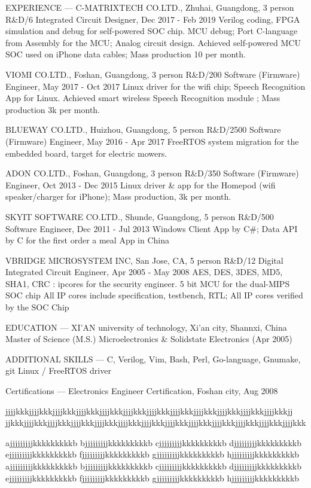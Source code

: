 EXPERIENCE
---
C-MATRIXTECH CO.LTD., Zhuhai, Guangdong, 3 person R\&D/6
Integrated Circuit Designer, Dec 2017 - Feb 2019
 Verilog coding, FPGA simulation and debug for self-powered SOC chip. 
 MCU debug; Port C-language from Assembly for the MCU; Analog circuit design.
 Achieved self-powered MCU SOC used on iPhone data cables; Mass production 10 per month.

VIOMI CO.LTD., Foshan, Guangdong, 3 person R\&D/200
Software (Firmware) Engineer, May 2017 - Oct 2017
 Linux driver for the wifi chip; Speech Recognition App for Linux.
 Achieved smart wireless Speech Recognition module ; Mass production 3k per month.

BLUEWAY CO.LTD., Huizhou, Guangdong, 5 person R\&D/2500
Software (Firmware) Engineer, May 2016 - Apr 2017
 FreeRTOS system migration for the embedded board, target for electric mowers.

ADON CO.LTD., Foshan, Guangdong, 3 person R\&D/350
Software (Firmware) Engineer, Oct 2013 - Dec 2015
 Linux driver \& app for the Homepod (wifi speaker/charger for iPhone); Mass production, 3k per month.

SKYIT SOFTWARE CO.LTD., Shunde, Guangdong, 5 person R\&D/500
Software Engineer, Dec 2011 - Jul 2013
 Windows Client App by C\#; Data API by C for the first order a meal App in China

VBRIDGE MICROSYSTEM INC, San Jose, CA, 5 person R\&D/12
Digital Integrated Circuit Engineer, Apr 2005 - May 2008
 AES, DES, 3DES, MD5, SHA1, CRC : ipcores for the security engineer. 
 5 bit MCU for the dual-MIPS SOC chip
 All IP cores include specification, testbench, RTL; All IP cores verified by the SOC Chip

EDUCATION
---
XI'AN university of technology, Xi'an city, Shannxi, China
Master of Science (M.S.) Microelectronics \& Solidstate Electronics (Apr 2005)

ADDITIONAL SKILLS
---
 C, Verilog, Vim, Bash, Perl, Go-language, Gnumake, git
 Linux / FreeRTOS driver

Certifications
---
Electronics Engineer Certification, Foshan city, Aug 2008

jjjjkkkjjjjkkkjjjjkkkjjjjkkkjjjjkkkjjjjkkkjjjjkkkjjjjkkkjjjjkkkjjjjkkkjjjjkkkjjjjkkkjj
jjkkkjjjjkkkjjjjkkkjjjjkkkjjjjkkkjjjjkkkjjjjkkkjjjjkkkjjjjkkkjjjjkkkjjjjkkkjjjjkkkjjjjkkk

ajjjjjjjjjkkkkkkkkkb
bjjjjjjjjjkkkkkkkkkb
cjjjjjjjjjkkkkkkkkkb
djjjjjjjjjkkkkkkkkkb
ejjjjjjjjjkkkkkkkkkb
fjjjjjjjjjkkkkkkkkkb
gjjjjjjjjjkkkkkkkkkb
hjjjjjjjjjkkkkkkkkkb
ajjjjjjjjjkkkkkkkkkb
bjjjjjjjjjkkkkkkkkkb
cjjjjjjjjjkkkkkkkkkb
djjjjjjjjjkkkkkkkkkb
ejjjjjjjjjkkkkkkkkkb
fjjjjjjjjjkkkkkkkkkb
gjjjjjjjjjkkkkkkkkkb
hjjjjjjjjjkkkkkkkkkb

